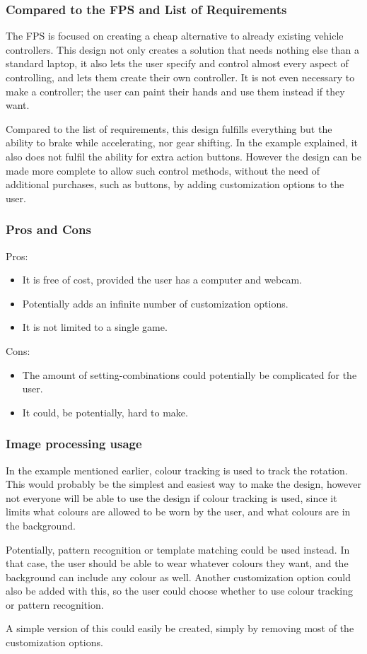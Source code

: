 \subsubsection*{Compared to the FPS and List of Requirements}
The FPS is focused on creating a cheap alternative to already existing vehicle controllers. This design not only creates a solution that needs nothing else than a standard laptop, it also lets the user specify and control almost every aspect of controlling, and lets them create their own controller. It is not even necessary to make a controller; the user can paint their hands and use them instead if they want.

Compared to the list of requirements, this design fulfills everything but the ability to brake while accelerating, nor gear shifting. In the example explained, it also does not fulfil the ability for extra action buttons. However the design can be made more complete to allow such control methods, without the need of additional purchases, such as buttons, by adding customization options to the user.


\pagebreak[2]
\subsubsection*{Pros and Cons}
Pros:
\begin{itemize}
\item It is free of cost, provided the user has a computer and webcam.
\item Potentially adds an infinite number of customization options.
\item It is not limited to a single game.
\end{itemize}
Cons:
\begin{itemize}
\item The amount of setting-combinations could potentially be complicated for the user.
\item It could, be potentially, hard to make.
\end{itemize}

\subsubsection*{Image processing usage}
In the example mentioned earlier, colour tracking is used to track the rotation. This would probably be the simplest and easiest way to make the design, however not everyone will be able to use the design if colour tracking is used, since it limits what colours are allowed to be worn by the user, and what colours are in the background.

Potentially, pattern recognition or template matching could be used instead. In that case, the user should be able to wear whatever colours they want, and the background can include any colour as well. Another customization option could also be added with this, so the user could choose whether to use colour tracking or pattern recognition.

A simple version of this could easily be created, simply by removing most of the customization options.
